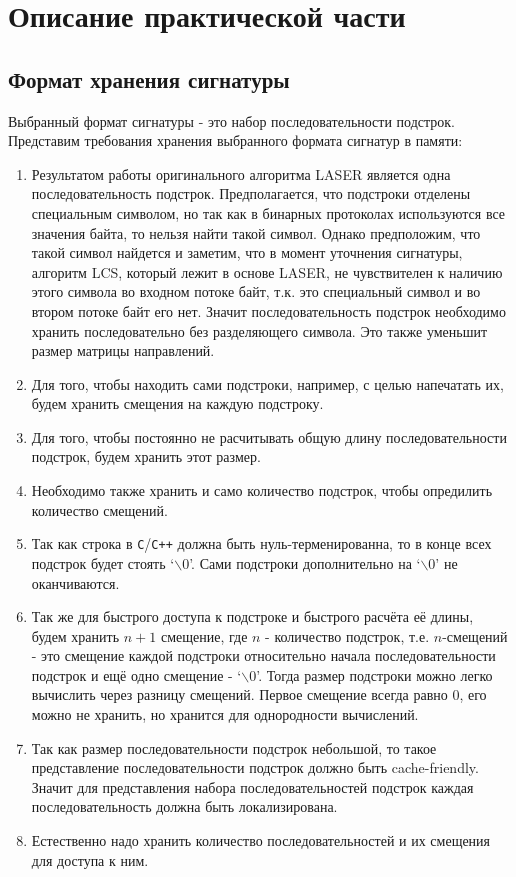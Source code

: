 \section{Описание практической части}
\label{sec:Section4} 

\subsection{Формат хранения сигнатуры}

Выбранный формат сигнатуры - это набор последовательности подстрок. Представим требования хранения выбранного формата сигнатур в памяти:

\begin{enumerate}
    \item Результатом работы оригинального алгоритма LASER является одна последовательность подстрок.
    Предполагается, что подстроки отделены специальным символом, но так как в бинарных протоколах используются все значения байта, то
    нельзя найти такой символ. Однако предположим, что такой символ найдется и заметим, что в момент уточнения сигнатуры, алгоритм LCS, который лежит в основе LASER,
    не чувствителен к наличию этого символа во входном потоке байт, т.к. это специальный символ и во втором потоке байт его нет.
    Значит последовательность подстрок необходимо хранить последовательно без разделяющего символа. Это также уменьшит размер матрицы направлений.
    \item Для того, чтобы находить сами подстроки, например, с целью напечатать их, будем хранить смещения на каждую подстроку.
    \item Для того, чтобы постоянно не расчитывать общую длину последовательности подстрок, будем хранить этот размер.
    \item Необходимо также хранить и само количество подстрок, чтобы опредилить количество смещений.
    \item Так как строка в \verb!C!/\verb!C++! должна быть нуль-терменированна, то в конце всех подстрок будет стоять  `$\backslash 0$'.
    Сами подстроки дополнительно на `$\backslash 0$' не оканчиваются.
    \item Так же для быстрого доступа к подстроке и быстрого расчёта её длины, будем хранить $n + 1$ смещение, где $n$ - количество подстрок,
    т.е. $n$-смещений - это смещение каждой подстроки относительно начала последовательности подстрок и ещё одно смещение - `$\backslash 0$'.
    Тогда размер подстроки можно легко вычислить через разницу смещений. Первое смещение всегда равно 0, его можно не хранить, но хранится для однородности вычислений.
    \item Так как размер последовательности подстрок небольшой, то такое представление последовательности подстрок должно быть cache-friendly.
    Значит для представления набора последовательностей подстрок каждая последовательность должна быть локализирована.
    \item Естественно надо хранить количество последовательностей и их смещения для доступа к ним.
\end{enumerate}


